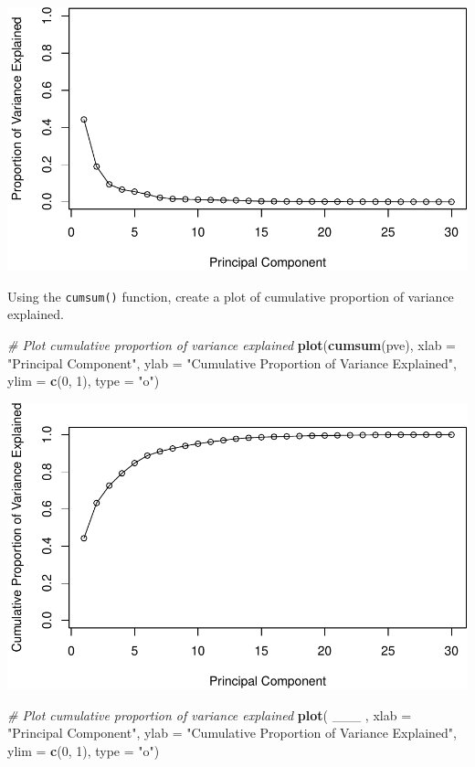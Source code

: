 \documentclass[]{article}
\newenvironment{Shaded}{\begin{snugshade}}{\end{snugshade}}
\newcommand{\KeywordTok}[1]{\textcolor[rgb]{0.13,0.29,0.53}{\textbf{#1}}}
\newcommand{\DataTypeTok}[1]{\textcolor[rgb]{0.13,0.29,0.53}{#1}}
\newcommand{\DecValTok}[1]{\textcolor[rgb]{0.00,0.00,0.81}{#1}}
\newcommand{\StringTok}[1]{\textcolor[rgb]{0.31,0.60,0.02}{#1}}
\newcommand{\CommentTok}[1]{\textcolor[rgb]{0.56,0.35,0.01}{\textit{#1}}}
\newcommand{\NormalTok}[1]{#1}
\begin{document}
\includegraphics{lecture9_lab_files/figure-latex/var-1.pdf}

Using the \texttt{cumsum()} function, create a plot of cumulative
proportion of variance explained.

\begin{Shaded}
\begin{Highlighting}[]
\CommentTok{# Plot cumulative proportion of variance explained}
\KeywordTok{plot}\NormalTok{(}\KeywordTok{cumsum}\NormalTok{(pve), }\DataTypeTok{xlab =} \StringTok{"Principal Component"}\NormalTok{, }
     \DataTypeTok{ylab =} \StringTok{"Cumulative Proportion of Variance Explained"}\NormalTok{, }
     \DataTypeTok{ylim =} \KeywordTok{c}\NormalTok{(}\DecValTok{0}\NormalTok{, }\DecValTok{1}\NormalTok{), }\DataTypeTok{type =} \StringTok{"o"}\NormalTok{)}
\end{Highlighting}
\end{Shaded}

\includegraphics{lecture9_lab_files/figure-latex/cumsum-1.pdf}

\begin{Shaded}
\begin{Highlighting}[]
\CommentTok{# Plot cumulative proportion of variance explained}
\KeywordTok{plot}\NormalTok{( ___ , }\DataTypeTok{xlab =} \StringTok{"Principal Component"}\NormalTok{, }
     \DataTypeTok{ylab =} \StringTok{"Cumulative Proportion of Variance Explained"}\NormalTok{, }
     \DataTypeTok{ylim =} \KeywordTok{c}\NormalTok{(}\DecValTok{0}\NormalTok{, }\DecValTok{1}\NormalTok{), }\DataTypeTok{type =} \StringTok{"o"}\NormalTok{)}
\end{Highlighting}
\end{Shaded}
\end{document}

